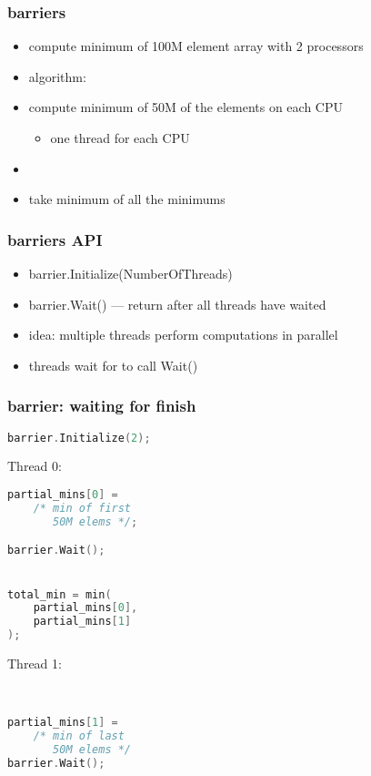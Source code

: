 \begin{frame}\frametitle{barriers}
\begin{itemize}
\item compute minimum of 100M element array with 2 processors
\item algorithm:
\vspace{.5cm}
\item compute minimum of 50M of the elements on each CPU
    \begin{itemize}
    \item one thread for each CPU
    \end{itemize}
\item {}
\item take minimum of all the minimums
\end{itemize}
\end{frame}

\begin{frame}\frametitle{barriers API}
\begin{itemize}
\item barrier.Initialize(NumberOfThreads)
\item barrier.Wait() --- return after all threads have waited
\vspace{.5cm}
\item idea: multiple threads perform computations in parallel
\item threads wait for  to call Wait()
\end{itemize}
\end{frame}

\begin{frame}[fragile,label=barrierWait]\frametitle{barrier: waiting for finish}
\begin{lstlisting}[language=C++,style=smaller]
barrier.Initialize(2);
\end{lstlisting}
\begin{minipage}{0.45\textwidth}
\small Thread 0:
\begin{lstlisting}[language=C++,style=smaller]
partial_mins[0] = 
    /* min of first
       50M elems */;

barrier.Wait();


total_min = min(
    partial_mins[0],
    partial_mins[1]
);
\end{lstlisting}
\end{minipage}
\begin{minipage}{0.45\textwidth}
\small Thread 1:
\begin{lstlisting}[language=C++,style=smaller]


partial_mins[1] =
    /* min of last
       50M elems */
barrier.Wait();
\end{lstlisting}
\end{minipage}
\end{frame}

